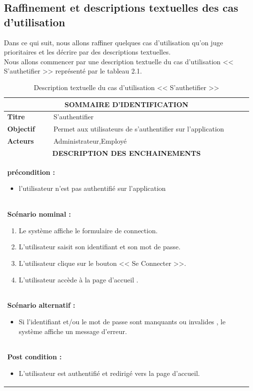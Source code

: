 \documentclass[12pt]{report}
\begin{document}
\subsection{Raffinement et descriptions textuelles des cas d'utilisation}
Dans ce qui suit, nous allons raffiner quelques cas d'utilisation qu'on juge prioritaires et les décrire par des descriptions textuelles.
\\
Nous allons commencer par une description textuelle du cas d'utilisation << S'authetifier >> représenté par le tableau 2.1.
\begin{table}[H]
\centering

\def\arraystretch{1.3}
\begin{tabular}{|p{2.5cm}|p{14.5cm}|}
   
   \hline
   \multicolumn{2}{|c|}{
   \textbf{SOMMAIRE D'IDENTIFICATION}
   } \\
   \hline
   \textbf{Titre}  &  S'authentifier \\
   \hline
   \textbf{Objectif} &  Permet aux utilisateurs de s'authentifier sur l'application  \\
   \hline
    \textbf{Acteurs}  &  Administrateur,Employé \\
   \hline
   \multicolumn{2}{|c|}{ \textbf{DESCRIPTION DES ENCHAINEMENTS} } \\
   \hline
   \multicolumn{2}{|p{17cm}|}{\textbf{ précondition : }
   \begin{itemize}[label={$\bullet$}]
      \item  l'utilisateur n'est pas authentifié sur l'application 
   \end{itemize}} \\
   \hline
   \multicolumn{2}{|p{17cm}|}{\textbf{ Scénario nominal : }
   \begin{enumerate}
      \item Le système affiche le formulaire de connection.
      \item  L'utilisateur saisit son identifiant et son mot de passe.
      \item  L'utilisateur clique sur le bouton  << Se Connecter >>.
      \item  L'utilisateur accède à la page d'accueil .
   \end{enumerate}} \\
   \hline
   \multicolumn{2}{|p{17cm}|}{\textbf{ Scénario alternatif : }
   \begin{itemize}[label={$\bullet$}]
      \item  Si l'identifiant et/ou le mot de passe sont manquants ou invalides , le système affiche un message d'erreur.      
   \end{itemize}} \\
   \hline
   \multicolumn{2}{|p{17cm}|}{\textbf{ Post condition : }
   \begin{itemize}[label={$\bullet$}]
      \item L'utilisateur est authentifié et redirigé vers la page d'accueil.
   \end{itemize}} \\
   \hline
\end{tabular}
\caption{Description textuelle du cas d'utilisation << S'authetifier >>}
\end{table}
\end{document}
